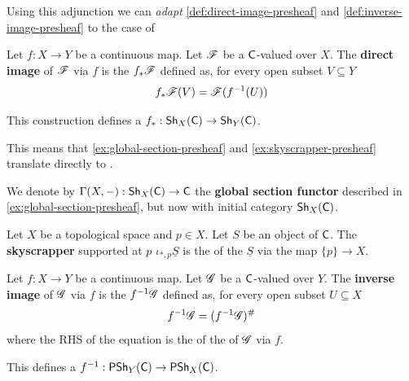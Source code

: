 \documentclass[../main.tex]{subfiles}
\begin{document}
Using this adjunction we can \textit{adapt} \autoref{def:direct-image-presheaf} and \autoref{def:inverse-image-presheaf} to the case of 
\begin{definition} \label{def:direct-image-sheaf}
  Let \(f: X \to Y\) be a continuous map.
  Let \(\mathscr{F}\) be a \(\mathsf{C}\)-valued  over \(X\).
  The \textbf{direct image } of \(\mathscr{F}\) via \(f\) is the  \(f_{\ast}\mathscr{F}\) defined as, for every open subset \(V \subseteq Y\)
  \begin{equation*}
    f_{\ast}\mathscr{F}(V) = \mathscr{F}(f^{-1}(U))
  \end{equation*}

  This construction defines a  \(f_{\ast}: \mathsf{Sh}_{X}(\mathsf{C}) \to \mathsf{Sh}_{Y}(\mathsf{C})\).
\end{definition}

This means that \autoref{ex:global-section-presheaf} and \autoref{ex:skyscrapper-presheaf} translate directly to .
\begin{definition} \label{def:global-section-functor}
  We denote by \(\Gamma(X, -): \mathsf{Sh}_{X}(\mathsf{C}) \to \mathsf{C}\) the \textbf{global section functor} described in \autoref{ex:global-section-presheaf}, but now with initial category \(\mathsf{Sh}_{X}(\mathsf{C})\).
\end{definition}
\begin{definition} \label{ex:skyscrapper-sheaf}
  Let \(X\) be a topological space and \(p \in X\).
  Let \(S\) be an object of \(\mathsf{C}\).
  The \textbf{skyscrapper } supported at \(p\) \(\iota_{\ast, p} \underline{S}\) is the  of the  \(\underline{S}\) via the map \(\{p\} \to X\).
\end{definition}

\begin{definition} \label{def:inverse-image-sheaf}
  Let \(f: X \to Y\) be a continuous map.
  Let \(\mathscr{G}\) be a \(\mathsf{C}\)-valued  over \(Y\).
  The \textbf{inverse image } of \(\mathscr{G}\) via \(f\) is the  \(f^{-1}\mathscr{G}\) defined as, for every open subset \(U \subseteq X\)
  \begin{equation*}
    f^{-1}\mathscr{G} = (f^{-1} \mathscr{G})^{\#}
  \end{equation*}
  where the RHS of the equation is the  of the  of \(\mathscr{G}\) via \(f\).

  This defines a  \(f^{-1}: \mathsf{PSh}_{Y}(\mathsf{C}) \to \mathsf{PSh}_{X}(\mathsf{C})\).
\end{definition}
\end{document}
